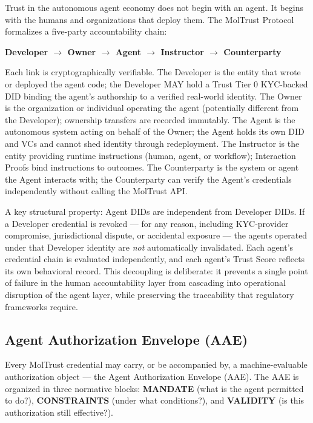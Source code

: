 Trust in the autonomous agent economy does not begin with an agent. It begins with the humans and organizations that deploy them. The MolTrust Protocol formalizes a five-party accountability chain:


\textbf{Developer $\rightarrow$ Owner $\rightarrow$ Agent $\rightarrow$ Instructor $\rightarrow$ Counterparty}


Each link is cryptographically verifiable. The Developer is the entity that wrote or deployed the agent code; the Developer MAY hold a Trust Tier 0 KYC-backed DID binding the agent's authorship to a verified real-world identity. The Owner is the organization or individual operating the agent (potentially different from the Developer); ownership transfers are recorded immutably. The Agent is the autonomous system acting on behalf of the Owner; the Agent holds its own DID and VCs and cannot shed identity through redeployment. The Instructor is the entity providing runtime instructions (human, agent, or workflow); Interaction Proofs bind instructions to outcomes. The Counterparty is the system or agent the Agent interacts with; the Counterparty can verify the Agent's credentials independently without calling the MolTrust API.


A key structural property: Agent DIDs are independent from Developer DIDs. If a Developer credential is revoked — for any reason, including KYC-provider compromise, jurisdictional dispute, or accidental exposure — the agents operated under that Developer identity are \textit{not} automatically invalidated. Each agent's credential chain is evaluated independently, and each agent's Trust Score reflects its own behavioral record. This decoupling is deliberate: it prevents a single point of failure in the human accountability layer from cascading into operational disruption of the agent layer, while preserving the traceability that regulatory frameworks require.


\subsection{Agent Authorization Envelope (AAE)}

Every MolTrust credential may carry, or be accompanied by, a machine-evaluable authorization object — the Agent Authorization Envelope (AAE). The AAE is organized in three normative blocks: \textbf{MANDATE} (what is the agent permitted to do?), \textbf{CONSTRAINTS} (under what conditions?), and \textbf{VALIDITY} (is this authorization still effective?).


